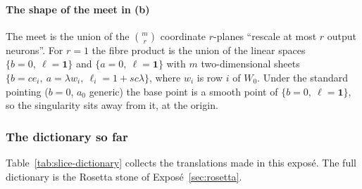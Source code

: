 \paragraph{The shape of the meet in (b)}
The meet is the union of the $\binom mr$ coordinate $r$-planes ``rescale at most $r$ output neurons''. For $r=1$ the fibre
product is the union of the linear spaces $\{b=0,\ \ell=\mathbf 1\}$ and $\{a=0,\ \ell=\mathbf 1\}$ with $m$
two-dimensional sheets $\{b=ce_i,\ a=\lambda w_i,\ \ell_i=1+sc\lambda\}$, where $w_i$ is row $i$ of $W_0$. Under the
standard pointing ($b=0$, $a_0$ generic) the base point is a smooth point of $\{b=0,\ \ell=\mathbf 1\}$, so the singularity
sits away from it, at the origin.

\subsubsection{The dictionary so far}\label{sec:slice-dictionary}

Table~\ref{tab:slice-dictionary} collects the translations made in this exposé. The full dictionary is the Rosetta stone
of Exposé~\ref{sec:rosetta}.

